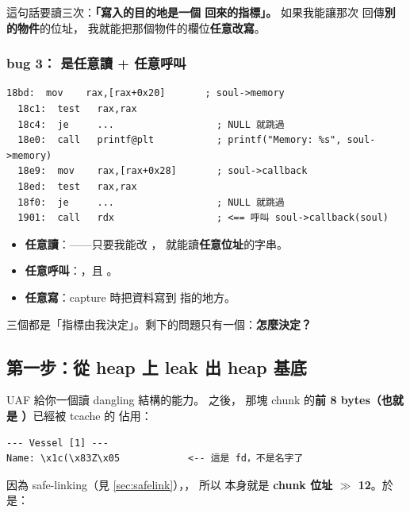 這句話要讀三次：\textbf{「寫入的目的地是一個  回來的指標」。}
如果我能讓那次  回傳\textbf{別的物件}的位址，
我就能把那個物件的欄位\textbf{任意改寫}。

\subsubsection{bug 3： 是任意讀 + 任意呼叫}

\begin{lstlisting}[style=asm]
  18bd:  mov    rax,[rax+0x20]       ; soul->memory
  18c1:  test   rax,rax
  18c4:  je     ...                  ; NULL 就跳過
  18e0:  call   printf@plt           ; printf("Memory: %s", soul->memory)
  18e9:  mov    rax,[rax+0x28]       ; soul->callback
  18ed:  test   rax,rax
  18f0:  je     ...                  ; NULL 就跳過
  1901:  call   rdx                  ; <== 呼叫 soul->callback(soul)
\end{lstlisting}

\begin{keybox}
\begin{itemize}[leftmargin=1.4em,itemsep=1pt]
  \item \textbf{任意讀}：——只要我能改 ，
        就能讀\textbf{任意位址}的字串。
  \item \textbf{任意呼叫}：，且 。
  \item \textbf{任意寫}：capture 時把資料寫到  指的地方。
\end{itemize}
三個都是「指標由我決定」。剩下的問題只有一個：\textbf{怎麼決定？}
\end{keybox}

\subsection{第一步：從 heap 上 leak 出 heap 基底}

UAF 給你一個讀 dangling 結構的能力。 之後，
 那塊 chunk 的\textbf{前 8 bytes（也就是 ）}已經被 tcache 的  佔用：

\begin{lstlisting}[style=raw]
--- Vessel [1] ---
Name: \x1c(\x83Z\x05            <-- 這是 fd，不是名字了
\end{lstlisting}

因為 safe-linking（見 \ref{sec:safelink}），，
所以  本身就是 \textbf{chunk 位址 $\gg$ 12}。於是：

